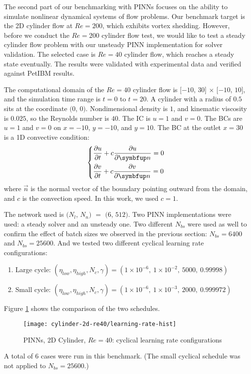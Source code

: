 The second part of our benchmarking with PINNs focuses on the ability to simulate nonlinear dynamical systems of flow problems.
Our benchmark target is the 2D cylinder flow at $Re=200$, which exhibits vortex shedding.
However, before we conduct the $Re=200$ cylinder flow test, we would like to test a steady cylinder flow problem with our unsteady PINN implementation for solver validation.
The selected case is $Re=40$ cylinder flow, which reaches a steady state eventually.
The results were validated with experimental data and verified against PetIBM results.

The computational domain of the $Re=40$ cylinder flow is $[-10$, $30]$ $\times$ $[-10$, $10]$, and the simulation time range is $t=0$ to $t=20$.
A cylinder with a radius of $0.5$ sits at the coordinate $(0$, $0)$.
Nondimensional density is $1$, and kinematic viscosity is $0.025$, so the Reynolds number is $40$.
The IC is $u=1$ and $v=0$.
The BCs are $u=1$ and $v=0$ on $x=-10$, $y=-10$, and $y=10$.
The BC at the outlet $x=30$ is a 1D convective condition:
\begin{equation}\label{eq:convec-bc}
    \left\{
    \begin{aligned}
        &\pdiff{u}{t} + c\pdiff{u}{\vec{n}} = 0 \\
        &\pdiff{v}{t} + c\pdiff{v}{\vec{n}} = 0 \\
    \end{aligned}
    \right.
\end{equation}
where $\vec{n}$ is the normal vector of the boundary pointing outward from the domain, and $c$ is the convection speed.
In this work, we used $c=1$.

The network used is $(N_l$, $N_n)$ $=$ $(6$, $512)$.
Two PINN implementations were used: a steady solver and an unsteady one.
Two different $N_{bs}$ were used as well to confirm the effect of batch sizes we observed in the previous section: $N_{bs}=\num{6400}$ and $N_{bs}=\num{25600}$.
And we tested two different cyclical learning rate configurations:
\begin{enumerate}[nolistsep]
    \item Large cycle: $(\eta_{low}, \eta_{high}, N_c, \gamma)=(1\times 10^{-6},\ 1\times 10^{-2},\ 5000,\ 0.99998)$
    \item Small cycle: $(\eta_{low}, \eta_{high}, N_c, \gamma)=(1\times 10^{-6},\ 1\times 10^{-3},\ 2000,\ 0.999972)$
\end{enumerate}
Figure \ref{fig:cylinder-2d-re40-lr-hist} shows the comparison of the two schedules.
\begin{figure}[hbt!]
    \texttt{[image: cylinder-2d-re40/learning-rate-hist]}
    \caption[%
        PINNs, 2D Cylinder, $Re=40$: cyclical learning rate configurations%
    ]{%
        PINNs, 2D Cylinder, $Re=40$: cyclical learning rate configurations%
    }%
    \label{fig:cylinder-2d-re40-lr-hist}
\end{figure}
A total of 6 cases were run in this benchmark.
(The small cyclical schedule was not applied to $N_{bs}=\num{25600}$.)

